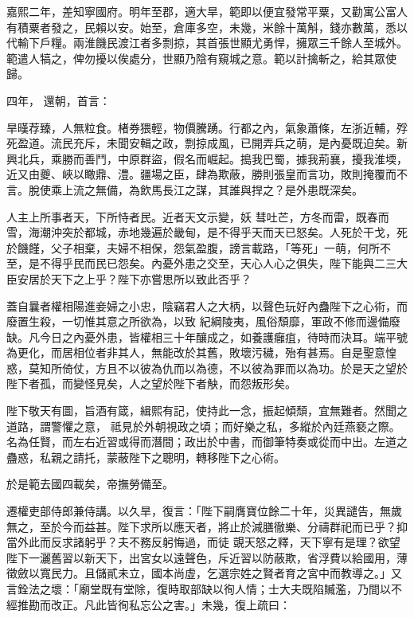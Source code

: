 \begin{pinyinscope}
 嘉熙二年，差知寧國府。明年至郡，適大旱，範即以便宜發常平粟，又勸寓公富人有積粟者發之，民賴以安。始至，倉庫多空，未幾，米餘十萬斛，錢亦數萬，悉以代輸下戶糧。兩淮饑民渡江者多剽掠，其首張世顯尤勇悍，擁眾三千餘人至城外。範遣人犒之，俾勿擾以俟處分，世顯乃陰有窺城之意。範以計擒斬之，給其眾使歸。



 四年，
 還朝，首言：



 旱暵荐臻，人無粒食。楮券猥輕，物價騰踴。行都之內，氣象蕭條，左浙近輔，殍死盈道。流民充斥，未聞安輯之政，剽掠成風，已開弄兵之萌，是內憂既迫矣。新興北兵，乘勝而善鬥，中原群盜，假名而崛起。搗我巴蜀，據我荊襄，擾我淮堧，近又由夔、峽以瞰鼎、澧。疆場之臣，肆為欺蔽，勝則張皇而言功，敗則掩覆而不言。脫使乘上流之無備，為飲馬長江之謀，其誰與捍之？是外患既深矣。



 人主上所事者天，下所恃者民。近者天文示變，妖
 彗吐芒，方冬而雷，既春而雪，海潮沖突於都城，赤地幾遍於畿甸，是不得乎天而天已怒矣。人死於干戈，死於饑饉，父子相棄，夫婦不相保，怨氣盈腹，謗言載路，「等死」一萌，何所不至，是不得乎民而民已怨矣。內憂外患之交至，天心人心之俱失，陛下能與二三大臣安居於天下之上乎？陛下亦嘗思所以致此否乎？



 蓋自曩者權相陽進妾婦之小忠，陰竊君人之大柄，以聲色玩好內蠱陛下之心術，而廢置生殺，一切惟其意之所欲為，以致
 紀綱陵夷，風俗頹靡，軍政不修而邊備廢缺。凡今日之內憂外患，皆權相三十年釀成之，如養護癰疽，待時而決耳。端平號為更化，而居相位者非其人，無能改於其舊，敗壞污穢，殆有甚焉。自是聖意惶惑，莫知所倚仗，方且不以彼為仇而以為德，不以彼為罪而以為功。於是天之望於陛下者孤，而變怪見矣，人之望於陛下者觖，而怨叛形矣。



 陛下敬天有圖，旨酒有箴，緝熙有記，使持此一念，振起傾頹，宜無難者。然聞之道路，謂警懼之意，
 祗見於外朝視政之頃；而好樂之私，多縱於內廷燕褻之際。名為任賢，而左右近習或得而潛間；政出於中書，而御筆特奏或從而中出。左道之蠱惑，私親之請托，蒙蔽陛下之聰明，轉移陛下之心術。



 於是範去國四載矣，帝撫勞備至。



 遷權吏部侍郎兼侍講。以久旱，復言：「陛下嗣膺寶位餘二十年，災異譴告，無歲無之，至於今而益甚。陛下求所以應天者，將止於減膳徹樂、分禱群祀而已乎？抑當外此而反求諸躬乎？夫不務反躬悔過，而徒
 覬天怒之釋，天下寧有是理？欲望陛下一灑舊習以新天下，出宮女以遠聲色，斥近習以防蔽欺，省浮費以給國用，薄徵斂以寬民力。且儲貳未立，國本尚虛，乞選宗姓之賢者育之宮中而教導之。」又言銓法之壞：「廟堂既有堂除，復時取部缺以徇人情；士大夫既陷贓濫，乃間以不經推勘而改正。凡此皆徇私忘公之害。」未幾，復上疏曰：




\end{pinyinscope}
